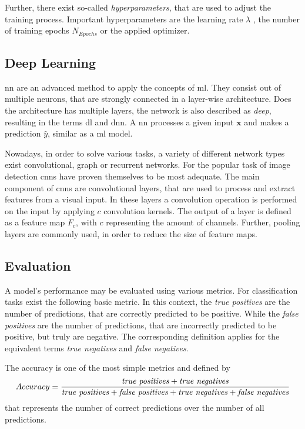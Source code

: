 Further, there exist so-called \textit{hyperparameters}, that are used to adjust the training process.
Important hyperparameters are the learning rate $\lambda$ , the number of training epochs $N_{Epochs}$ or the applied optimizer.


\subsection{Deep Learning}\label{ord:ch2:sec1:subsec2}

\gls{nn} are an advanced method to apply the concepts of \gls{ml}.
They consist out of multiple neurons, that are strongly connected in a layer-wise architecture.
Does the architecture has multiple layers, the network is also described as \textit{deep}, resulting in the terms \gls{dl} and \gls{dnn}.
A \gls{nn} processes a given input $\textbf{x}$ and makes a prediction $\hat{y}$, similar as a \gls{ml} model.

Nowadays, in order to solve various tasks, a variety of different network types exist \eg convolutional, graph or recurrent networks.
For the popular task of image detection \glspl{cnn} have proven themselves to be most adequate.
The main component of \glspl{cnn} are convolutional layers, that are used to process and extract features from a visual input.
In these layers a convolution operation is performed on the input by applying $c$ convolution kernels.
The output of a layer is defined as a feature map $F_c$, with $c$ representing the amount of channels.
Further, pooling layers are commonly used, in order to reduce the size of feature maps.


\subsection{Evaluation}\label{ord:ch2:sec1:subsec3}

A model's performance may be evaluated using various metrics.
For classification tasks exist the following basic metric.
In this context, the \textit{true positives} are the number of predictions, that are correctly predicted to be positive.
While the \textit{false positives} are the number of predictions, that are incorrectly predicted to be positive, but truly are negative.
The corresponding definition applies for the equivalent terms \textit{true negatives} and \textit{false negatives}.

The accuracy is one of the most simple metrics and defined by 
\begin{equation}
	Accuracy = \frac{\textnormal{\textit{true positives}} + \textnormal{\textit{true negatives}}}
	{\textnormal{\textit{true positives}} + \textnormal{\textit{false positives}} + \textnormal{\textit{true negatives}} + \textnormal{\textit{false negatives}}}
\end{equation}
that represents the number of correct predictions over the number of all predictions.

